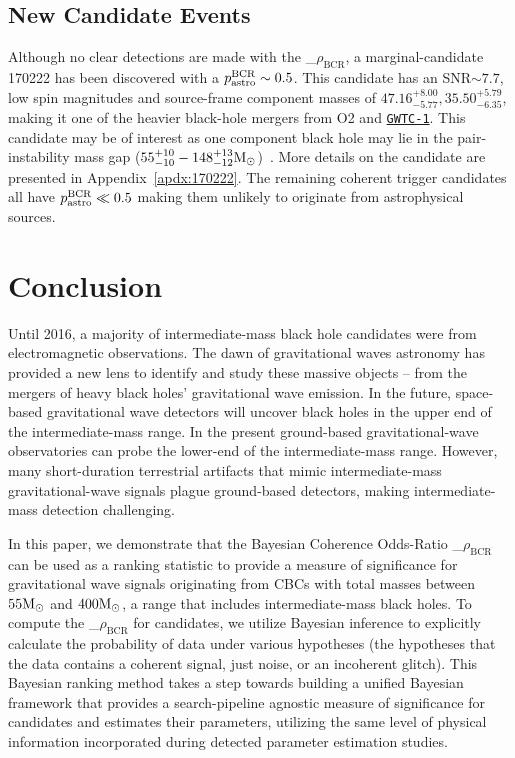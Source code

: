 \documentclass[%
 nofootinbib,
 amsmath,amssymb,
 aps,
 twocolumn,
 superscriptaddress
]{revtex4-2}
\newcommand{\GWTC}{{\sc \href{https://ui.adsabs.harvard.edu/abs/2019PhRvX...9c1040A/abstract}{\texttt{GWTC-1}}}\xspace}
\newcommand{\fancytext}[1]{{\relax\ifmmode#1\else $#1$\fi}\xspace}
\newcommand{\mathcmd}[1]{{\sc \relax\ifmmode#1\else $#1$\fi}\xspace}
\newcommand{\bcr}{\mathcmd{\rho_\text{BCR}}}
\newcommand{\msun}{\mathcmd{\text{M}_\odot}}
\newcommand{\pastrobcr}{\fancytext{p_\text{astro}^{\text{BCR}}}}
\begin{document}
\subsection{New Candidate Events}
Although no clear detections are made with the \bcr, a marginal-candidate 170222 has been discovered with a $\pastrobcr\sim0.5$. This candidate has an SNR$\sim7.7$, low spin magnitudes and source-frame component masses of ${47.16}_{-5.77}^{+8.00}, {35.50}_{-6.35}^{+5.79}$, making it one of the heavier black-hole mergers from O2 and \GWTC. This candidate may be of interest as one component black hole may lie in the pair-instability mass gap ($55^{+10}_{-10}-148^{+13}_{-12}\msun$)~\cite{Woosley:2021:arXiv, Heger:2002:ApJ}. More details on the candidate are presented in Appendix~\ref{apdx:170222}. The remaining coherent trigger candidates all have $\pastrobcr\ll0.5$ making them unlikely to originate from astrophysical sources. 



\section{\label{sec:Conclusion}Conclusion}

Until 2016, a majority of intermediate-mass black hole candidates were from electromagnetic observations. The dawn of gravitational waves astronomy has provided a new lens to identify and study these massive objects -- from the mergers of heavy black holes' gravitational wave emission. In the future, space-based gravitational wave detectors will uncover black holes in the upper end of the intermediate-mass range. In the present ground-based gravitational-wave observatories can probe the lower-end of the intermediate-mass range. However, many short-duration terrestrial artifacts that mimic intermediate-mass gravitational-wave signals plague ground-based detectors, making intermediate-mass detection challenging. 

In this paper, we demonstrate that the Bayesian Coherence Odds-Ratio \bcr~\cite{BCR1} can be used as a ranking statistic to provide a measure of significance for gravitational wave signals originating from CBCs with total masses between $55\msun$ and $400\msun$, a range that includes intermediate-mass black holes. To compute the \bcr for candidates, we utilize Bayesian inference to explicitly calculate the probability of data under various hypotheses (the hypotheses that the data contains a coherent signal, just noise, or an incoherent glitch). This Bayesian ranking method takes a step towards building a unified Bayesian framework that provides a search-pipeline agnostic measure of significance for candidates and estimates their parameters, utilizing the same level of physical information incorporated during detected parameter estimation studies. 
\end{document}
